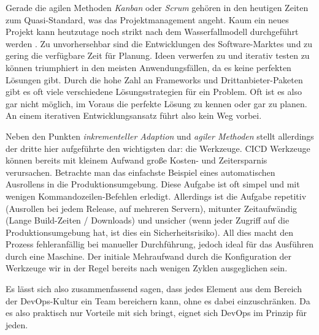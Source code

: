 Gerade die agilen Methoden \emph{Kanban} oder \emph{Scrum} \cite{froemlingAgileMethodenWas2021} gehören in den heutigen Zeiten zum Quasi-Standard, was das Projektmanagement angeht. Kaum ein neues Projekt kann heutzutage noch strikt nach dem Wasserfallmodell durchgeführt werden \cite{tutorialspointSDLCWaterfallModel}. Zu unvorhersehbar sind die Entwicklungen des Software-Marktes und zu gering die verfügbare Zeit für Planung.
Ideen verwerfen zu und iterativ testen zu können triumphiert in den meisten Anwendungsfällen, da es keine \glqq perfekten\grqq{} Lösungen gibt.
Durch die hohe Zahl an Frameworks und Drittanbieter-Paketen gibt es oft viele verschiedene Lösungsstrategien für ein Problem.
Oft ist es also gar nicht möglich, im Voraus die \glqq perfekte\grqq{} Lösung zu kennen oder gar zu planen. An einem iterativen Entwicklungsansatz führt also kein Weg vorbei.

Neben den Punkten \emph{inkrementeller Adaption} und \emph{agiler Methoden} stellt allerdings der dritte hier aufgeführte den wichtigsten dar: die Werkzeuge.
CICD Werkzeuge können bereits mit kleinem Aufwand große Kosten- und Zeitersparnis verursachen. 
Betrachte man das einfachste Beispiel eines automatischen Ausrollens in die Produktionsumgebung. 
Diese Aufgabe ist oft simpel und mit wenigen Kommandozeilen-Befehlen erledigt. Allerdings ist die Aufgabe repetitiv (Ausrollen bei jedem Release, auf mehreren Servern), mitunter Zeitaufwändig (Lange Build-Zeiten / Downloads) und unsicher (wenn jeder Zugriff auf die Produktionsumgebung hat, ist dies ein Sicherheitsrisiko).
All dies macht den Prozess fehleranfällig bei manueller Durchführung, jedoch ideal für das Ausführen durch eine Maschine. 
Der initiale Mehraufwand durch die Konfiguration der Werkzeuge wir in der Regel bereits nach wenigen Zyklen ausgeglichen sein. 

Es lässt sich also zusammenfassend sagen, dass jedes Element aus dem Bereich der DevOps-Kultur ein Team bereichern kann, ohne es dabei einzuschränken.
Da es also praktisch nur Vorteile mit sich bringt, eignet sich DevOps im Prinzip für jeden.
